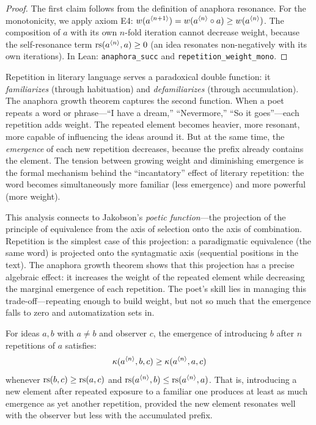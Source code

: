 \begin{proof}
The first claim follows from the definition of anaphora resonance.  For the monotonicity, we apply axiom E4: $w(a^{\langle n+1 \rangle}) = w(a^{\langle n \rangle} \circ a) \geq w(a^{\langle n \rangle})$.  The composition of $a$ with its own $n$-fold iteration cannot decrease weight, because the self-resonance term $\mathrm{rs}(a^{\langle n \rangle}, a) \geq 0$ (an idea resonates non-negatively with its own iterations).  In Lean: \texttt{anaphora\_succ} and \texttt{repetition\_weight\_mono}.
\end{proof}

\begin{interpretation}
\label{interp:repetition-defam}
Repetition in literary language serves a paradoxical double function: it \emph{familiarizes} (through habituation) and \emph{defamiliarizes} (through accumulation).  The anaphora growth theorem captures the second function.  When a poet repeats a word or phrase---``I have a dream,'' ``Nevermore,'' ``So it goes''---each repetition adds weight.  The repeated element becomes heavier, more resonant, more capable of influencing the ideas around it.  But at the same time, the \emph{emergence} of each new repetition decreases, because the prefix already contains the element.  The tension between growing weight and diminishing emergence is the formal mechanism behind the ``incantatory'' effect of literary repetition: the word becomes simultaneously more familiar (less emergence) and more powerful (more weight).

This analysis connects to Jakobson's \emph{poetic function}---the projection of the principle of equivalence from the axis of selection onto the axis of combination.  Repetition is the simplest case of this projection: a paradigmatic equivalence (the same word) is projected onto the syntagmatic axis (sequential positions in the text).  The anaphora growth theorem shows that this projection has a precise algebraic effect: it increases the weight of the repeated element while decreasing the marginal emergence of each repetition.  The poet's skill lies in managing this trade-off---repeating enough to build weight, but not so much that the emergence falls to zero and automatization sets in.
\end{interpretation}

\begin{theorem}
\label{thm:variation-emergence}
For ideas $a, b$ with $a \neq b$ and observer $c$, the emergence of introducing $b$ after $n$ repetitions of $a$ satisfies:
\[
  \kappa(a^{\langle n \rangle}, b, c) \geq \kappa(a^{\langle n \rangle}, a, c)
\]
whenever $\mathrm{rs}(b, c) \geq \mathrm{rs}(a, c)$ and $\mathrm{rs}(a^{\langle n \rangle}, b) \leq \mathrm{rs}(a^{\langle n \rangle}, a)$.  That is, introducing a new element after repeated exposure to a familiar one produces at least as much emergence as yet another repetition, provided the new element resonates well with the observer but less with the accumulated prefix.
\end{theorem}

